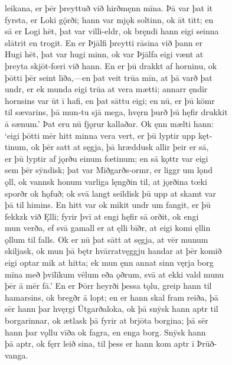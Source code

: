 \documentclass[12pt,letterpaper]{book}
\begin{document}
\begin{linenumbers}
leikana, er þēr þreyttuð við hirðmęnn mīna.  Þā var þat it\\
fyrsta, er Loki gǫ̈rði; hann var mjǫk soltinn, ok āt tītt; en\\
sā er Logi hēt, þat var villi-eldr, ok bręndi hann eigi seinna\\
slātrit en trogit.  En er Þjālfi þreytti rāsina við þann er\\
Hugi hēt, þat var hugi minn, ok var Þjālfa eigi vænt at\\
þreyta skjōt-fœri við hann.  En er þū drakkt af horninu, ok\\
þōtti þēr seint līða,---en þat veit trūa mīn, at þā varð þat\\
undr, er ek munda eigi trūa at vera mætti; annarr ęndir\\
hornsins var ūt ī hafi, en þat sāttu eigi; en nū, er þū kömr\\
til sævarins, þā mun-tu sjā mega, hvęrn þurð þū hęfir drukkit\\
ā sænum.'  Þat eru nū fjǫrur kallaðar.  Ok ęnn mælti hann:\\
`eigi þōtti mēr hitt minna vera vert, er þū lyptir upp kęt-\\
tinum, ok þēr satt at sęgja, þā hræddusk allir þeir er sā,\\
er þū lyptir af jǫrðu einum fœtinum; en sā kǫttr var eigi\\
sem þēr sȳndisk; þat var Miðgarðs-ormr, er liggr um lǫnd\\
ǫll, ok vannsk honum varliga lęngðin til, at jǫrðina tœki\\
sporðr ok hǫfuð; ok svā langt seildisk þū upp at skamt var\\
þā til himins.  En hitt var ok mikit undr um fangit, er þū\\
fekkzk við Ęlli; fyrir þvī at engi hęfir sā orðit, ok engi\\
mun verða, ef svā gamall er at ęlli bīðr, at eigi komi ęllin\\
ǫllum til falls.  Ok er nū þat sātt at sęgja, at vēr munum\\
skiljask, ok mun þā bętr hvārratvęggju handar at þēr komið\\
eigi optar mik at hitta; ek mun ęnn annat sinn vęrja borg\\
mīna með þvīlīkum vēlum eða ǫðrum, svā at ekki vald munu\\
þēr ā mēr fā.'  En er Þōrr heyrði þessa tǫlu, greip hann til\\
hamarsins, ok bregðr ā lopt; en er hann skal fram reiða, þā\\
sēr hann þar hvęrgi Ūtgarðaloka, ok þā snȳsk hann aptr til\\
borgarinnar, ok ætlask þā fyrir at brjōta borgina; þā sēr\\
hann þar vǫllu vīða ok fagra, en enga borg.  Snȳsk hann\\
þā aptr, ok fęrr leið sina, til þess er hann kom aptr ī Þrūð-\\
vanga.

\end{linenumbers}
\end{document}
